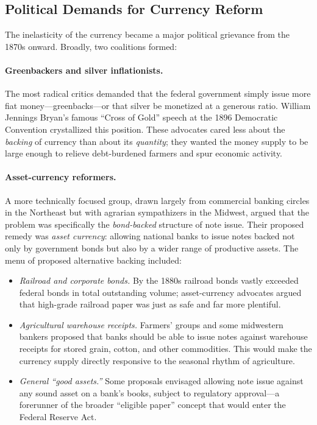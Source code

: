 \documentclass[12pt]{article}
\begin{document}
\subsection{Political Demands for Currency Reform}

The inelasticity of the currency became a major political grievance from the
1870s onward.  Broadly, two coalitions formed:

\paragraph{Greenbackers and silver inflationists.}  The most radical critics demanded
that the federal government simply issue more fiat money---greenbacks---or that
silver be monetized at a generous ratio.  William Jennings Bryan's famous ``Cross
of Gold'' speech at the 1896 Democratic Convention crystallized this position.
These advocates cared less about the \emph{backing} of currency than about its
\emph{quantity}; they wanted the money supply to be large enough to relieve
debt-burdened farmers and spur economic activity.

\paragraph{Asset-currency reformers.}  A more technically focused group, drawn
largely from commercial banking circles in the Northeast but with agrarian
sympathizers in the Midwest, argued that the problem was specifically the
\emph{bond-backed} structure of note issue.  Their proposed remedy was
\emph{asset currency}: allowing national banks to issue notes backed not only by
government bonds but also by a wider range of productive assets.  The menu of
proposed alternative backing included:
\begin{itemize}
  \item \emph{Railroad and corporate bonds.}  By the 1880s railroad bonds vastly
    exceeded federal bonds in total outstanding volume; asset-currency advocates
    argued that high-grade railroad paper was just as safe and far more plentiful.
  \item \emph{Agricultural warehouse receipts.}  Farmers' groups and some midwestern
    bankers proposed that banks should be able to issue notes against warehouse
    receipts for stored grain, cotton, and other commodities.  This would make
    the currency supply directly responsive to the seasonal rhythm of agriculture.
  \item \emph{General ``good assets.''} Some proposals envisaged allowing note
    issue against any sound asset on a bank's books, subject to regulatory
    approval---a forerunner of the broader ``eligible paper'' concept that would
    enter the Federal Reserve Act.
\end{itemize}
\end{document}
